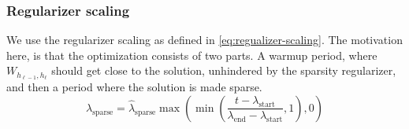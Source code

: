 \subsubsection{Regularizer scaling}
We use the regularizer scaling as defined in \eqref{eq:regualizer-scaling}. The motivation here, is that the optimization consists of two parts. A warmup period, where $W_{h_{\ell-1},h_\ell}$ should get close to the solution, unhindered by the sparsity regularizer, and then a period where the solution is made sparse.
\begin{equation}
\lambda_{\mathrm{sparse}} = \hat{\lambda}_{\mathrm{sparse}} \max(\min(\frac{t - \lambda_{\mathrm{start}}}{\lambda_{\mathrm{end}} - \lambda_{\mathrm{start}}}, 1), 0)
\label{eq:regualizer-scaling}
\end{equation}
